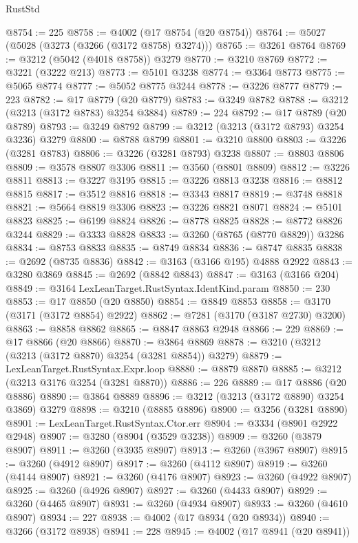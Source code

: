 \begin{lexlean}{RustStd}
\begin{coremodule}
@8754 := 225
@8758 := @4002 (@17 @8754 (@20 @8754))
@8764 := @5027 (@5028 (@3273 (@3266 (@3172 @8758) @3274)))
@8765 := @3261 @8764
@8769 := @3212 (@5042 (@4018 @8758)) @3279
@8770 := @3210 @8769
@8772 := @3221 (@3222 @213)
@8773 := @5101 @3238
@8774 := @3364 @8773
@8775 := @5065 @8774
@8777 := @5052 @8775 @3244
@8778 := @3226 @8777
@8779 := 223
@8782 := @17 @8779 (@20 @8779)
@8783 := @3249 @8782
@8788 := @3212 (@3213 (@3172 @8783) @3254 @3884)
@8789 := 224
@8792 := @17 @8789 (@20 @8789)
@8793 := @3249 @8792
@8799 := @3212 (@3213 (@3172 @8793) @3254 @3236) @3279
@8800 := @8788 @8799
@8801 := @3210 @8800
@8803 := @3226 (@3281 @8783)
@8806 := @3226 (@3281 @8793) @3238
@8807 := @8803 @8806
@8809 := @3578 @8807 @3306
@8811 := @3560 (@8801 @8809)
@8812 := @3226 @8811
@8813 := @3227 @3195
@8815 := @3226 @8813 @3238
@8816 := @8812 @8815
@8817 := @3512 @8816
@8818 := @3343 @8817
@8819 := @3748 @8818
@8821 := @5664 @8819 @3306
@8823 := @3226 @8821 @8071
@8824 := @5101 @8823
@8825 := @6199 @8824
@8826 := @8778 @8825
@8828 := @8772 @8826 @3244
@8829 := @3333 @8828
@8833 := @3260 (@8765 (@8770 @8829)) @3286
@8834 := @8753 @8833
@8835 := @8749 @8834
@8836 := @8747 @8835
@8838 := @2692 (@8735 @8836)
@8842 := @3163 (@3166 @195) @4888 @2922
@8843 := @3280 @3869
@8845 := @2692 (@8842 @8843)
@8847 := @3163 (@3166 @204)
@8849 := @3164 LexLeanTarget.RustSyntax.IdentKind.param
@8850 := 230
@8853 := @17 @8850 (@20 @8850)
@8854 := @8849 @8853
@8858 := @3170 (@3171 (@3172 @8854) @2922)
@8862 := @7281 (@3170 (@3187 @2730) @3200)
@8863 := @8858 @8862
@8865 := @8847 @8863 @2948
@8866 := 229
@8869 := @17 @8866 (@20 @8866)
@8870 := @3864 @8869
@8878 := @3210 (@3212 (@3213 (@3172 @8870) @3254 (@3281 @8854)) @3279)
@8879 := LexLeanTarget.RustSyntax.Expr.loop
@8880 := @8879 @8870
@8885 := @3212 (@3213 @3176 @3254 (@3281 @8870))
@8886 := 226
@8889 := @17 @8886 (@20 @8886)
@8890 := @3864 @8889
@8896 := @3212 (@3213 (@3172 @8890) @3254 @3869) @3279
@8898 := @3210 (@8885 @8896)
@8900 := @3256 (@3281 @8890)
@8901 := LexLeanTarget.RustSyntax.Ctor.err
@8904 := @3334 (@8901 @2922 @2948)
@8907 := @3280 (@8904 (@3529 @3238))
@8909 := @3260 (@3879 @8907)
@8911 := @3260 (@3935 @8907)
@8913 := @3260 (@3967 @8907)
@8915 := @3260 (@4912 @8907)
@8917 := @3260 (@4112 @8907)
@8919 := @3260 (@4144 @8907)
@8921 := @3260 (@4176 @8907)
@8923 := @3260 (@4922 @8907)
@8925 := @3260 (@4926 @8907)
@8927 := @3260 (@4433 @8907)
@8929 := @3260 (@4465 @8907)
@8931 := @3260 (@4934 @8907)
@8933 := @3260 (@4610 @8907)
@8934 := 227
@8938 := @4002 (@17 @8934 (@20 @8934))
@8940 := @3266 (@3172 @8938)
@8941 := 228
@8945 := @4002 (@17 @8941 (@20 @8941))

\end{coremodule}
\end{lexlean}
